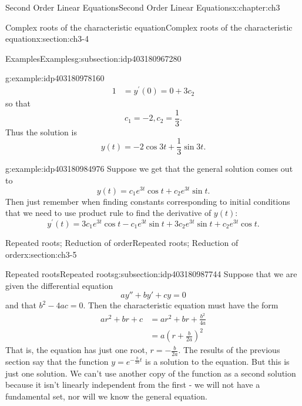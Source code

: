 \documentclass[oneside,10pt,]{book}
\numberwithin{equation}{section}
\numberwithin{equation}{section}
\newcommand{\amp}{&}
\begin{document}
\begin{chapterptx}{Second Order Linear Equations}{}{Second Order Linear Equations}{}{}{x:chapter:ch3}
\begin{sectionptx}{Complex roots of the characteristic equation}{}{Complex roots of the characteristic equation}{}{}{x:section:ch3-4}
\begin{subsectionptx}{Examples}{}{Examples}{}{}{g:subsection:idp403180967280}
\begin{example}{}{g:example:idp403180978160}
\begin{align*}
1 \amp =y^{\prime}(0)=0+3c_{2}
\end{align*}
so that%
\begin{equation*}
c_{1}=-2,c_{2}=\frac{1}{3}.
\end{equation*}
Thus the solution is%
\begin{equation*}
y(t)=-2\cos3t+\frac{1}{3}\sin3t.
\end{equation*}
%
\end{example}
\begin{example}{}{g:example:idp403180984976}%
Suppose we get that the general solution comes out to%
\begin{equation*}
y(t)=c_{1}e^{3t}\cos t+c_{2}e^{3t}\sin t.
\end{equation*}
Then just remember when finding constants corresponding to initial conditions that we need to use product rule to find the derivative of \(y(t)\):%
\begin{equation*}
y^{\prime}(t)=3c_{1}e^{3t}\cos t-c_{1}e^{3t}\sin t+3c_{2}e^{3t}\sin t+c_{2}e^{3t}\cos t.
\end{equation*}
%
\end{example}
\end{subsectionptx}
\end{sectionptx}
%
%
\typeout{************************************************}
\typeout{************************************************}
%
\begin{sectionptx}{Repeated roots; Reduction of order}{}{Repeated roots; Reduction of order}{}{}{x:section:ch3-5}
%
%
\typeout{************************************************}
\typeout{************************************************}
%
\begin{subsectionptx}{Repeated roots}{}{Repeated roots}{}{}{g:subsection:idp403180987744}
Suppose that we are given the differential equation%
\begin{equation*}
ay'' + by' + cy = 0
\end{equation*}
and that \(b^2 - 4ac = 0\). Then the characteristic equation must have the form%
\begin{align*}
ar^2 + br + c \amp= ar^2 + br + \frac{b^2}{4a}\\
\amp= a(r + \frac{b}{2a})^2
\end{align*}
That is, the equation has just one root, \(r = -\frac{b}{2a}\). The results of the previous section say that the function \(y = e^{-\frac{b}{2a} t}\) is a solution to the equation. But this is just one solution. We can't use another copy of the function as a second solution because it isn't linearly independent from the first - we will not have a fundamental set, nor will we know the general equation.%

\end{subsectionptx}
\end{sectionptx}
\end{chapterptx}
\end{document}
